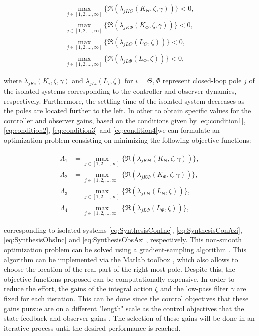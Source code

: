 \documentclass[main.tex]{subfiles}
\begin{document}
\begin{align}
	\max_{j\in[1,2,...,\infty]} \{\Re(\lambda_{jK\Theta}(K_{\Theta},\zeta,\gamma)) \} < 0,
	\label{eq:condition1} \\
	\max_{j\in[1,2,...,\infty]} \{\Re(\lambda_{jK\Phi}(K_{\Phi},\zeta,\gamma)) \} < 0,
	\label{eq:condition2} \\
	\max_{j\in[1,2,...,\infty]} \{\Re(\lambda_{jL\Theta}(L_{\Theta},\zeta)) \} < 0,
	\label{eq:condition3} \\
	\max_{j\in[1,2,...,\infty]} \{\Re(\lambda_{jL\Phi}(L_{\Phi},\zeta)) \} < 0,
	\label{eq:condition4}
\end{align}

where $\lambda_{jKi}(K_{i},\zeta,\gamma)$ and $\lambda_{jLi}(L_{i},\zeta)$ for $i = \Theta, \Phi$ represent closed-loop pole $j$ of the isolated systems corresponding to the controller and observer dynamics, respectively. Furthermore, the settling time of the isolated system decreases as the poles are located further to the left. In other to obtain specific values for the controller and observer gains, based on the conditions given by \eqref{eq:condition1}, \eqref{eq:condition2}, \eqref{eq:condition3} and \eqref{eq:condition4}we can formulate an optimization problem consisting on minimizing the following objective functions:

\begin{align}
\varLambda_1 &= \max_{j\in[1,2,...,\infty]} \{\Re(\lambda_{jK\Theta}(K_{\Theta},\zeta,\gamma)) \},
\label{eq:op1} \\
\varLambda_2  &= \max_{j\in[1,2,...,\infty]} \{\Re(\lambda_{jK\Phi}(K_{\Phi},\zeta,\gamma)) \} ,
\label{eq:op2} \\
\varLambda_3 &= \max_{j\in[1,2,...,\infty]} \{\Re(\lambda_{jL\Theta}(L_{\Theta},\zeta)) \},
\label{eq:op3} \\
\varLambda_4 &= \max_{j\in[1,2,...,\infty]} \{\Re(\lambda_{jL\Phi}(L_{\Phi},\zeta)) \},
\label{eq:op4}
\end{align}

corresponding to isolated systems \eqref{eq:SynthesisConInc}, \eqref{eq:SynthesisConAzi}, \eqref{eq:SynthesisObsInc} and \eqref{eq:SynthesisObsAzi}, respectively. This non-smooth optimization problem can be solved using a gradient-sampling algorithm \cite{Kremers2013}. This algorithm can be implemented via the Matlab toolbox \cite{Michiels:2007:SST:1355294}, which also allows to choose the location of the real part of the right-most pole. Despite this, the objective functions proposed can be computationally expensive. In order to reduce the effort, the gains of the integral action $\zeta$ and the low-pass filter $\gamma$ are fixed for each iteration. This can be done since the control objectives that these gains pursue are on a different "length" scale as the control objectives that the state-feedback and observer gains \cite{Monsieurs2015}. The selection of these gains will be done in an iterative process until the desired performance is reached.
\end{document}
